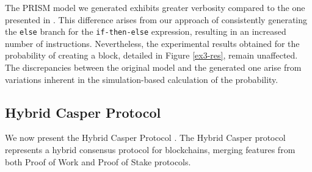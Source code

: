 The PRISM model we generated exhibits greater verbosity compared to the one presented in \cite{DBLP:journals/concurrency/BistarelliNGLMV23}. This difference arises from our approach of consistently generating the \texttt{else} branch for the \texttt{if-then-else} expression, resulting in an increased number of instructions.
Nevertheless, the experimental results obtained for the probability of
creating a block, detailed in Figure \ref{ex3-res}, remain
unaffected. The discrepancies between the original model and the
generated one arise from variations inherent in the simulation-based
calculation of the probability.


\subsection{Hybrid Casper Protocol}
\begin{comment}
\begin{wrapfigure}[12]{l}{4.5cm}
	\texttt{[image: ethereum.pdf]}	
\end{wrapfigure} 
\end{comment}
We now present the Hybrid Casper Protocol \cite{DBLP:journals/distribledger/GallettaLMV23}. The Hybrid Casper protocol represents a hybrid consensus protocol for blockchains, merging features from both Proof of Work and Proof of Stake protocols. 

